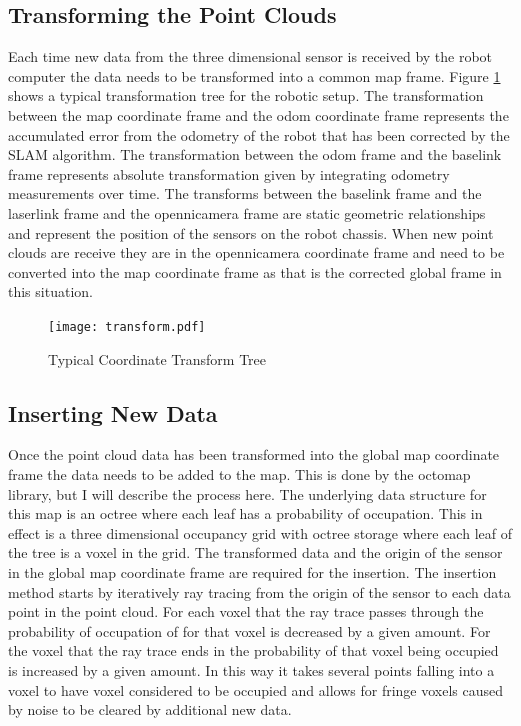 \documentclass[12pt]{report}
\begin{document}
\subsection{Transforming the Point Clouds}
Each time new data from the three dimensional sensor is received by the robot computer the data needs to be transformed into a common map frame. Figure \ref{fig:transforms} shows a typical transformation tree for the robotic setup. The transformation between the map coordinate frame and the odom coordinate frame represents the accumulated error from the odometry of the robot that has been corrected by the SLAM algorithm. The transformation between the odom frame and the base\textunderscore{}link frame represents absolute transformation given by integrating odometry measurements over time. The transforms between the base\textunderscore{}link frame and the laser\textunderscore{}link frame and the openni\textunderscore{}camera frame are static geometric relationships and represent the position of the sensors on the robot chassis. When new point clouds are receive they are in the openni\textunderscore{}camera coordinate frame and need to be converted into the map coordinate frame as that is the corrected global frame in this situation.

\begin{figure}[ht]
  \centering
  \texttt{[image: transform.pdf]}
  \caption{Typical Coordinate Transform Tree}
  \label{fig:transforms}
\end{figure}

\subsection{Inserting New Data}
Once the point cloud data has been transformed into the global map coordinate frame the data needs to be added to the map. This is done by the octomap library, but I will describe the process here. The underlying data structure for this map is an octree where each leaf has a probability of occupation. This in effect is a three dimensional occupancy grid with octree storage where each leaf of the tree is a voxel in the grid. The transformed data and the origin of the sensor in the global map coordinate frame are required for the insertion. The insertion method starts by iteratively ray tracing from the origin of the sensor to each data point in the point cloud.  For each voxel that the ray trace passes through the probability of occupation of for that voxel is decreased by a given amount. For the voxel that the ray trace ends in the probability of that voxel being occupied is increased by a given amount. In this way it takes several points falling into a voxel to have voxel considered to be occupied and allows for fringe voxels caused by noise to be cleared by additional new data.
\end{document}
